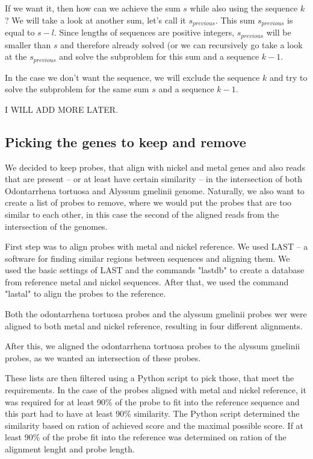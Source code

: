 If we want it, then how can we achieve 
the sum $s$ while also using the sequence $k$? We will take a look at another sum, let's call it $s_{previous}$. This sum $s_{previous}$ is equal to $s - l$. Since lengths of sequences are positive integers, $s_{previous}$ will be 
smaller than $s$ and therefore already solved (or we can recursively go take a look at the $s_{previous}$ and solve the subproblem for this sum and a sequence $k-1$. 

In the case we don't want the sequence, we will exclude the sequence $k$ and try to solve the subproblem for the same sum $s$ and a sequence $k-1$. 

I WILL ADD MORE LATER. 

\subsection{Picking the genes to keep and remove}

We decided to keep probes, that align with nickel and metal genes and also reads that are present -- or at least have certain similarity -- in the intersection of both 
Odontarrhena tortuosa and Alyssum gmelinii genome. Naturally, we also want to create a list of probes to remove, where we would put the probes that are too similar to each other, in this 
case the second of the aligned reads from the intersection of the genomes. 

First step was to align probes with metal and nickel reference. We used LAST -- a software for finding similar regions between sequences and aligning them. \cite{last} 
We used the basic settings of LAST and the commands "lastdb" to create a database from reference metal and nickel sequences. After that, we used the command "lastal" to 
align the probes to the reference. 

Both the odontarrhena tortuosa probes and the alyssum gmelinii probes wer were aligned to both metal and nickel reference, resulting in four different alignments. 

After this, we aligned the odontarrhena tortuosa probes to the alyssum gmelinii probes, as we wanted an intersection of these probes. 

These lists are then filtered using a Python script to pick those, that meet the requirements. 
In the case of the probes aligned with metal and nickel reference, it was required for at least 90\% of the probe to fit into the reference sequence and this part had to have at least 90\% similarity. 
The Python script determined the similarity based on ration of achieved score and the maximal possible score. If at least 90\% of the probe fit into the reference was determined on ration of the alignment lenght 
and probe length. 

